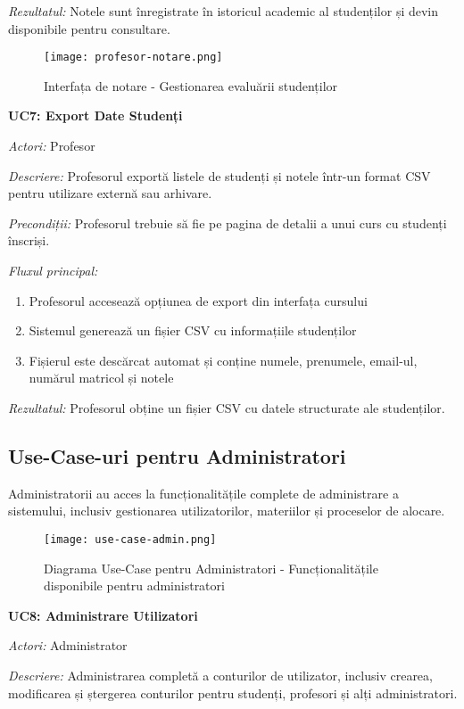 \documentclass[12pt,a4paper]{report}
\begin{document}
\textit{Rezultatul:} Notele sunt înregistrate în istoricul academic al studenților și devin disponibile pentru consultare.

\begin{figure}[H]
\centering
\texttt{[image: profesor-notare.png]}
\caption{Interfața de notare - Gestionarea evaluării studenților}
\label{fig:profesor-notare}
\end{figure}

\textbf{UC7: Export Date Studenți}

\textit{Actori:} Profesor

\textit{Descriere:} Profesorul exportă listele de studenți și notele într-un format CSV pentru utilizare externă sau arhivare.

\textit{Precondiții:} Profesorul trebuie să fie pe pagina de detalii a unui curs cu studenți înscriși.

\textit{Fluxul principal:}
\begin{enumerate}
\item Profesorul accesează opțiunea de export din interfața cursului
\item Sistemul generează un fișier CSV cu informațiile studenților
\item Fișierul este descărcat automat și conține numele, prenumele, email-ul, numărul matricol și notele
\end{enumerate}

\textit{Rezultatul:} Profesorul obține un fișier CSV cu datele structurate ale studenților.

\subsection{Use-Case-uri pentru Administratori}

Administratorii au acces la funcționalitățile complete de administrare a sistemului, inclusiv gestionarea utilizatorilor, materiilor și proceselor de alocare.

\begin{figure}[H]
\centering
\texttt{[image: use-case-admin.png]}
\caption{Diagrama Use-Case pentru Administratori - Funcționalitățile disponibile pentru administratori}
\label{fig:use-case-admin}
\end{figure}

\textbf{UC8: Administrare Utilizatori}

\textit{Actori:} Administrator

\textit{Descriere:} Administrarea completă a conturilor de utilizator, inclusiv crearea, modificarea și ștergerea conturilor pentru studenți, profesori și alți administratori.
\end{document}
